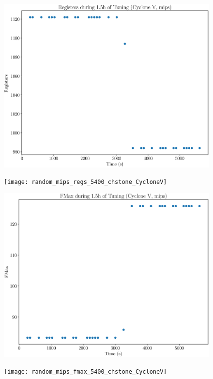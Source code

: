 \documentclass[12pt, a4paper]{article}
\begin{document}
\begin{figure}[htpb]
    \begin{minipage}{.48\textwidth}
        \includegraphics[scale=.25]{mips_regs_5400_chstone_CycloneV}
    \end{minipage}%
    \hfill
    \begin{minipage}{.48\textwidth}
        \texttt{[image: random\_mips\_regs\_5400\_chstone\_CycloneV]}
    \end{minipage}%

    \begin{minipage}{.48\textwidth}
        \includegraphics[scale=.25]{mips_fmax_5400_chstone_CycloneV}
    \end{minipage}%
    \hfill
    \begin{minipage}{.48\textwidth}
        \texttt{[image: random\_mips\_fmax\_5400\_chstone\_CycloneV]}
    \end{minipage}%
\end{figure}
\end{document}
